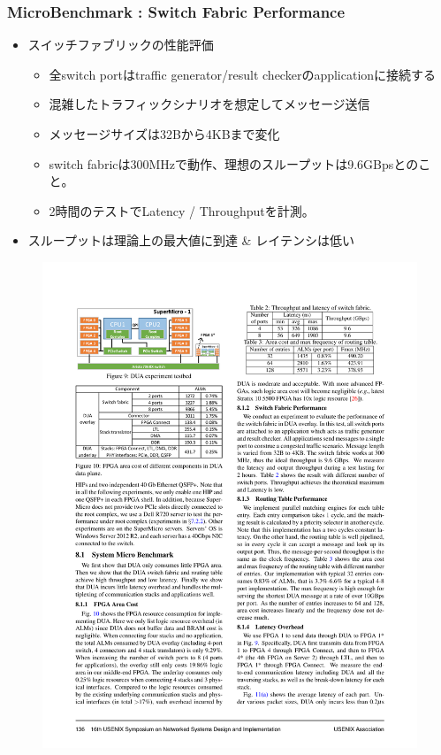 \documentclass[dvipdfmx,9pt,notheorems]{beamer}
\theoremstyle{definition}
\begin{document}
\begin{frame}\frametitle{MicroBenchmark : Switch Fabric Performance}
	\begin{itemize}
			\item スイッチファブリックの性能評価
				\begin{itemize}
    			\item 全switch portはtraffic generator/result checkerのapplicationに接続する
    			\item 混雑したトラフィックシナリオを想定してメッセージ送信
    			\item メッセージサイズは32Bから4KBまで変化
    			\item switch fabricは300MHzで動作、理想のスループットは9.6GBpsとのこと。
    			\item 2時間のテストでLatency / Throughputを計測。
				\end{itemize}
			\item スループットは理論上の最大値に到達 \& レイテンシは低い
	\end{itemize}
  \begin{figure}[htb]
		\includegraphics[scale=1.0]{fig/table2.pdf}
  \end{figure}
\pnote{
}

\end{frame}
\end{document}
